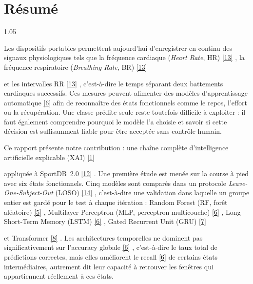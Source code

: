 \documentclass[12pt,a4paper]{article}
\newcommand{\openaccessref}[2]{%
  \nobreak\hspace{0.08em}%
  \href{#2}{\textcolor{green!35!black}{[#1]}}%
}
\begin{document}
\hypersetup{pageanchor=true}



\section*{Résumé}

\begin{spacing}{1.05}

Les dispositifs portables permettent aujourd'hui d'enregistrer en continu des
signaux physiologiques tels que la fréquence cardiaque (\emph{Heart Rate},
HR)\openaccessref{13}{https://cinc.org/archives/2023/pdf/CinC2023-067.pdf},
la fréquence respiratoire (\emph{Breathing Rate}, BR)\openaccessref{13}{https://cinc.org/archives/2023/pdf/CinC2023-067.pdf}
et les intervalles RR\openaccessref{13}{https://cinc.org/archives/2023/pdf/CinC2023-067.pdf},
c'est-à-dire le temps séparant deux battements cardiaques successifs. Ces
mesures peuvent alimenter des modèles d'apprentissage automatique\openaccessref{6}{https://www.deeplearningbook.org} afin de
reconnaître des états fonctionnels comme le repos, l'effort ou la
récupération. Une classe prédite seule reste toutefois difficile à exploiter :
il faut également comprendre pourquoi le modèle l'a choisie et savoir si cette
décision est suffisamment fiable pour être acceptée sans contrôle humain.

Ce rapport présente notre contribution : une chaîne complète d'intelligence
artificielle explicable (XAI)\openaccessref{1}{https://www.mdpi.com/1099-4300/23/1/18}
appliquée à SportDB~2.0\openaccessref{12}{https://data.mendeley.com/datasets/kzkjkt7mx2/2}. Une première étude est menée
sur la course à pied avec six états fonctionnels. Cinq modèles sont comparés
dans un protocole \emph{Leave-One-Subject-Out} (LOSO)\openaccessref{14}{https://arxiv.org/abs/1904.02666}, c'est-à-dire une
validation dans laquelle un groupe entier est gardé pour le test à chaque
itération : Random Forest (RF, forêt aléatoire)\openaccessref{5}{https://www.stat.berkeley.edu/~breiman/randomforest2001.pdf},
Multilayer Perceptron (MLP, perceptron multicouche)\openaccessref{6}{https://www.deeplearningbook.org},
Long Short-Term Memory (LSTM)\openaccessref{6}{https://www.deeplearningbook.org},
Gated Recurrent Unit (GRU)\openaccessref{7}{https://arxiv.org/abs/1406.1078}
et Transformer\openaccessref{8}{https://arxiv.org/abs/1706.03762}. Les architectures temporelles ne dominent pas
significativement sur l'accuracy globale\openaccessref{6}{https://www.deeplearningbook.org}, c'est-à-dire le taux total de
prédictions correctes, mais elles améliorent le recall\openaccessref{6}{https://www.deeplearningbook.org} de certains états
intermédiaires, autrement dit leur capacité à retrouver les fenêtres qui
appartiennent réellement à ces états.


\end{spacing}
\end{document}
